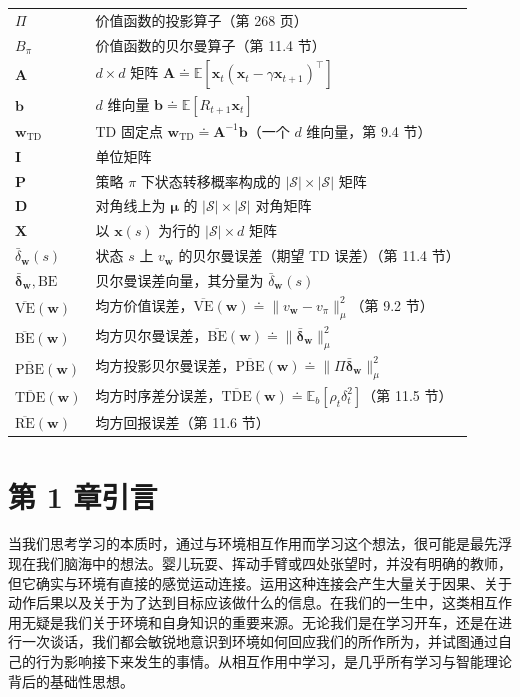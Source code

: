 \documentclass[UTF8,12pt,a4paper,fontset=fandol]{ctexart}
\begin{document}
\begin{longtable}{p{}p{}}
$\Pi$ & 价值函数的投影算子（第 268 页） \\
$B_\pi$ & 价值函数的贝尔曼算子（第 11.4 节） \\
$\mathbf{A}$ & $d\times d$ 矩阵 $\mathbf{A}\doteq\mathbb{E}\!\left[\mathbf{x}_t(\mathbf{x}_t-\gamma\mathbf{x}_{t+1})^\top\right]$ \\
$\mathbf{b}$ & $d$ 维向量 $\mathbf{b}\doteq\mathbb{E}[R_{t+1}\mathbf{x}_t]$ \\
$\mathbf{w}_{\mathrm{TD}}$ & TD 固定点 $\mathbf{w}_{\mathrm{TD}}\doteq\mathbf{A}^{-1}\mathbf{b}$（一个 $d$ 维向量，第 9.4 节） \\
$\mathbf{I}$ & 单位矩阵 \\
$\mathbf{P}$ & 策略 $\pi$ 下状态转移概率构成的 $|\mathcal{S}|\times|\mathcal{S}|$ 矩阵 \\
$\mathbf{D}$ & 对角线上为 $\boldsymbol{\mu}$ 的 $|\mathcal{S}|\times|\mathcal{S}|$ 对角矩阵 \\
$\mathbf{X}$ & 以 $\mathbf{x}(s)$ 为行的 $|\mathcal{S}|\times d$ 矩阵 \\
$\bar\delta_{\mathbf{w}}(s)$ & 状态 $s$ 上 $v_{\mathbf{w}}$ 的贝尔曼误差（期望 TD 误差）（第 11.4 节） \\
$\bar{\boldsymbol{\delta}}_{\mathbf{w}},\mathrm{BE}$ & 贝尔曼误差向量，其分量为 $\bar\delta_{\mathbf{w}}(s)$ \\
$\overline{\mathrm{VE}}(\mathbf{w})$ & 均方价值误差，$\overline{\mathrm{VE}}(\mathbf{w})\doteq\|v_{\mathbf{w}}-v_\pi\|_\mu^2$（第 9.2 节） \\
$\overline{\mathrm{BE}}(\mathbf{w})$ & 均方贝尔曼误差，$\overline{\mathrm{BE}}(\mathbf{w})\doteq\|\bar{\boldsymbol{\delta}}_{\mathbf{w}}\|_\mu^2$ \\
$\overline{\mathrm{PBE}}(\mathbf{w})$ & 均方投影贝尔曼误差，$\overline{\mathrm{PBE}}(\mathbf{w})\doteq\|\Pi\bar{\boldsymbol{\delta}}_{\mathbf{w}}\|_\mu^2$ \\
$\overline{\mathrm{TDE}}(\mathbf{w})$ & 均方时序差分误差，$\overline{\mathrm{TDE}}(\mathbf{w})\doteq\mathbb{E}_b[\rho_t\delta_t^2]$（第 11.5 节） \\
$\overline{\mathrm{RE}}(\mathbf{w})$ & 均方回报误差（第 11.6 节） \\
\end{longtable}

\section*{第 1 章\quad 引言}

当我们思考学习的本质时，通过与环境相互作用而学习这个想法，很可能是最先浮现在我们脑海中的想法。婴儿玩耍、挥动手臂或四处张望时，并没有明确的教师，但它确实与环境有直接的感觉运动连接。运用这种连接会产生大量关于因果、关于动作后果以及关于为了达到目标应该做什么的信息。在我们的一生中，这类相互作用无疑是我们关于环境和自身知识的重要来源。无论我们是在学习开车，还是在进行一次谈话，我们都会敏锐地意识到环境如何回应我们的所作所为，并试图通过自己的行为影响接下来发生的事情。从相互作用中学习，是几乎所有学习与智能理论背后的基础性思想。
\end{document}
